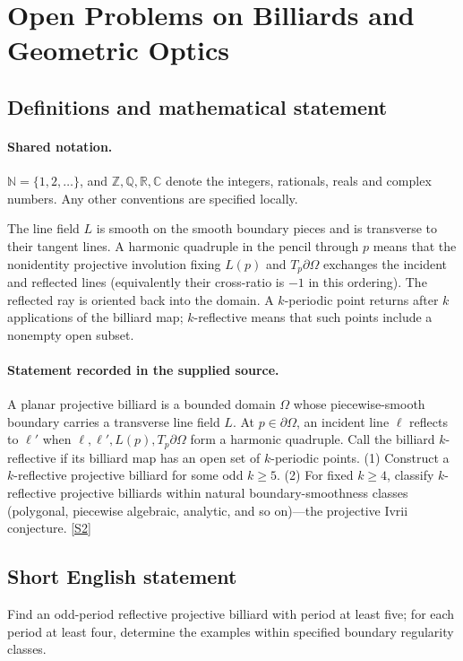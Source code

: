 \documentclass[11pt]{article}
\newcommand{\sref}[2]{\hyperlink{source:#1:#2}{[S#2]}}
\begin{document}
\section{Open Problems on Billiards and Geometric Optics}\label{statement}

\subsection{Definitions and mathematical statement}

\paragraph{Shared notation.}$\mathbb N=\{1,2,\ldots\}$, and $\mathbb Z,\mathbb Q,\mathbb R,\mathbb C$ denote the integers, rationals, reals and complex numbers. Any other conventions are specified locally.


The line field $L$ is smooth on the smooth boundary pieces and is transverse to their tangent lines. A harmonic quadruple in the pencil through $p$ means that the nonidentity projective involution fixing $L(p)$ and $T_p\partial\Omega$ exchanges the incident and reflected lines (equivalently their cross-ratio is $-1$ in this ordering). The reflected ray is oriented back into the domain. A $k$-periodic point returns after $k$ applications of the billiard map; $k$-reflective means that such points include a nonempty open subset.
\paragraph{Statement recorded in the supplied source.}
A planar projective billiard is a bounded domain $\Omega$ whose piecewise-smooth boundary carries a transverse line field $L$. At $p\in\partial\Omega$, an incident line $\ell$ reflects to $\ell'$ when $\ell,\ell',L(p),T_p\partial\Omega$ form a harmonic quadruple. Call the billiard $k$-reflective if its billiard map has an open set of $k$-periodic points. (1) Construct a $k$-reflective projective billiard for some odd $k\ge5$. (2) For fixed $k\ge4$, classify $k$-reflective projective billiards within natural boundary-smoothness classes (polygonal, piecewise algebraic, analytic, and so on)—the projective Ivrii conjecture. \sref{statement}{2}
\subsection{Short English statement}
Find an odd-period reflective projective billiard with period at least five; for each period at least four, determine the examples within specified boundary regularity classes.
\end{document}

